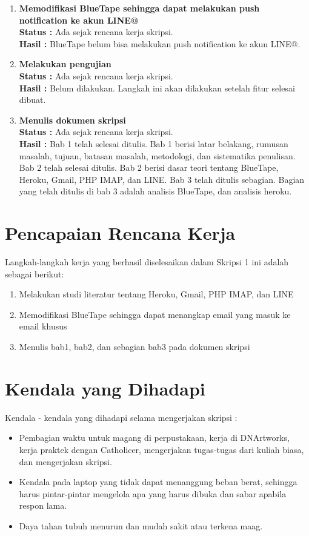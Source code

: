 \documentclass[a4paper,twoside]{article}
\begin{document}
\begin{enumerate}
	\item \textbf{Memodifikasi BlueTape sehingga dapat melakukan push notification ke akun LINE@}\\
	{\bf Status :} Ada sejak rencana kerja skripsi.\\
	{\bf Hasil :} BlueTape belum bisa melakukan push notification ke akun LINE@.
		
	\item \textbf{Melakukan pengujian}\\
	{\bf Status :} Ada sejak rencana kerja skripsi.\\
	{\bf Hasil :} Belum dilakukan. Langkah ini akan dilakukan setelah fitur selesai dibuat. 
		
	\item \textbf{Menulis dokumen skripsi}\\
	{\bf Status :} Ada sejak rencana kerja skripsi.\\
	{\bf Hasil :} Bab 1 telah selesai ditulis. Bab 1 berisi latar belakang, rumusan masalah, tujuan, batasan masalah, metodologi, dan sistematika penulisan. Bab 2 telah selesai ditulis. Bab 2 berisi dasar teori tentang BlueTape, Heroku, Gmail, PHP IMAP, dan LINE. Bab 3 telah ditulis sebagian. Bagian yang telah ditulis di bab 3 adalah analisis BlueTape, dan analisis heroku.
\end{enumerate}

\section{Pencapaian Rencana Kerja}
Langkah-langkah kerja yang berhasil diselesaikan dalam Skripsi 1 ini adalah sebagai berikut:
\begin{enumerate}
\item Melakukan studi literatur tentang Heroku, Gmail, PHP IMAP, dan LINE
\item Memodifikasi BlueTape sehingga dapat menangkap email yang masuk ke email khusus
\item Menulis bab1, bab2, dan sebagian bab3 pada dokumen skripsi
\end{enumerate}



\section{Kendala yang Dihadapi}
Kendala - kendala yang dihadapi selama mengerjakan skripsi :
\begin{itemize}
	\item Pembagian waktu untuk magang di perpustakaan, kerja di DNArtworks, kerja praktek dengan Catholicer, mengerjakan tugas-tugas dari kuliah biasa, dan mengerjakan skripsi.
	\item Kendala pada laptop yang tidak dapat menanggung beban berat, sehingga harus pintar-pintar mengelola apa yang harus dibuka dan sabar apabila respon lama.
	\item Daya tahan tubuh menurun dan mudah sakit atau terkena maag.
\end{itemize}
\end{document}
